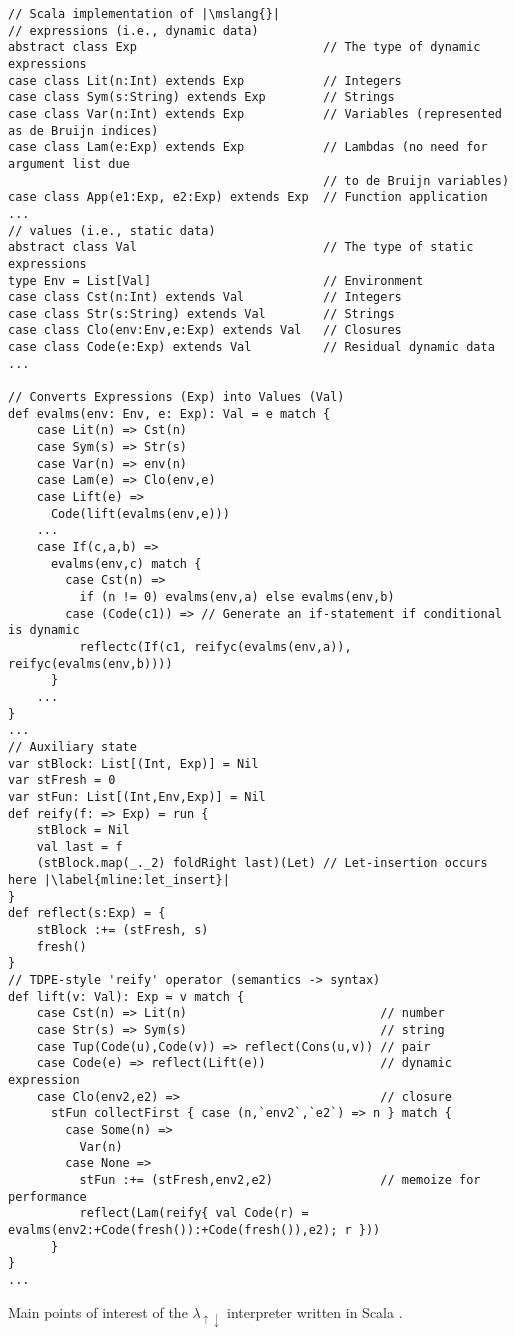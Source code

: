 \documentclass[a4paper,12pt,twoside,openright]{report}
\theoremstyle{definition}
\newcommand{\mslang}{$\lambda_{\uparrow\downarrow}$}
\newenvironment{longlisting}{\captionsetup{type=listing}}{}
\begin{document}
\newpage
\begin{longlisting}
    \centering
    \begin{verbatim}
// Scala implementation of |\mslang{}|
// expressions (i.e., dynamic data)
abstract class Exp                          // The type of dynamic expressions
case class Lit(n:Int) extends Exp           // Integers
case class Sym(s:String) extends Exp        // Strings
case class Var(n:Int) extends Exp           // Variables (represented as de Bruijn indices)
case class Lam(e:Exp) extends Exp           // Lambdas (no need for argument list due
                                            // to de Bruijn variables)
case class App(e1:Exp, e2:Exp) extends Exp  // Function application
...
// values (i.e., static data)
abstract class Val                          // The type of static expressions
type Env = List[Val]                        // Environment
case class Cst(n:Int) extends Val           // Integers
case class Str(s:String) extends Val        // Strings
case class Clo(env:Env,e:Exp) extends Val   // Closures
case class Code(e:Exp) extends Val          // Residual dynamic data
...

// Converts Expressions (Exp) into Values (Val)
def evalms(env: Env, e: Exp): Val = e match {
    case Lit(n) => Cst(n)
    case Sym(s) => Str(s)
    case Var(n) => env(n)
    case Lam(e) => Clo(env,e)
    case Lift(e) =>
      Code(lift(evalms(env,e)))
    ...
    case If(c,a,b) =>
      evalms(env,c) match {
        case Cst(n) => 
          if (n != 0) evalms(env,a) else evalms(env,b)
        case (Code(c1)) => // Generate an if-statement if conditional is dynamic
          reflectc(If(c1, reifyc(evalms(env,a)), reifyc(evalms(env,b))))
      }
    ...
}
...
// Auxiliary state
var stBlock: List[(Int, Exp)] = Nil
var stFresh = 0
var stFun: List[(Int,Env,Exp)] = Nil
def reify(f: => Exp) = run {
    stBlock = Nil
    val last = f
    (stBlock.map(_._2) foldRight last)(Let) // Let-insertion occurs here |\label{mline:let_insert}|
}
def reflect(s:Exp) = {
    stBlock :+= (stFresh, s)
    fresh()
}
// TDPE-style 'reify' operator (semantics -> syntax)
def lift(v: Val): Exp = v match {
    case Cst(n) => Lit(n)                           // number
    case Str(s) => Sym(s)                           // string
    case Tup(Code(u),Code(v)) => reflect(Cons(u,v)) // pair
    case Code(e) => reflect(Lift(e))                // dynamic expression
    case Clo(env2,e2) =>                            // closure
      stFun collectFirst { case (n,`env2`,`e2`) => n } match {
        case Some(n) =>
          Var(n)
        case None =>
          stFun :+= (stFresh,env2,e2)               // memoize for performance
          reflect(Lam(reify{ val Code(r) = evalms(env2:+Code(fresh()):+Code(fresh()),e2); r }))
      }
}
...
    \end{verbatim}
    \caption{Main points of interest of the \mslang{} interpreter written in Scala \cite{odersky2004overview}.}
    \label{lst:evalms}
\end{longlisting}
\newpage
\end{document}
